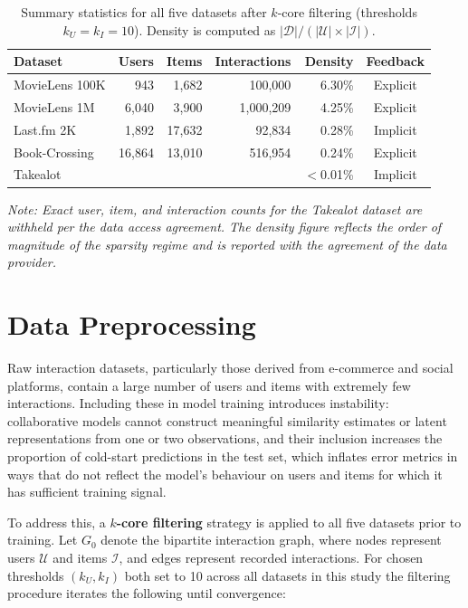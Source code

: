 \documentclass[11pt,a4paper]{report}
\begin{document}
\begin{table}[htbp]
\centering
\caption{Summary statistics for all five datasets after $k$-core filtering (thresholds $k_U = k_I = 10$). Density is computed as $|\mathcal{D}| / (|\mathcal{U}| \times |\mathcal{I}|)$.}
\label{tab:datasets}
\begin{tabular}{lrrrrc}
\hline
\textbf{Dataset} & \textbf{Users} & \textbf{Items} & \textbf{Interactions} & \textbf{Density} & \textbf{Feedback} \\
\hline
MovieLens 100K  & 943   & 1{,}682  & 100{,}000   & 6.30\%  & Explicit \\
MovieLens 1M    & 6{,}040 & 3{,}900 & 1{,}000{,}209 & 4.25\% & Explicit \\
Last.fm 2K      & 1{,}892 & 17{,}632 & 92{,}834   & 0.28\%  & Implicit \\
Book-Crossing   & 16{,}864 & 13{,}010 & 516{,}954 & 0.24\%  & Explicit \\
Takealot        &     &        &           & $<$0.01\% & Implicit \\
\hline
\end{tabular}
\end{table}

\noindent\textit{Note: Exact user, item, and interaction counts for the Takealot dataset are withheld per the data access agreement. The density figure reflects the order of magnitude of the sparsity regime and is reported with the agreement of the data provider.}

\section{Data Preprocessing}
\label{sec:method_preprocessing}

Raw interaction datasets, particularly those derived from e-commerce and social platforms, contain a large number of users and items with extremely few interactions. Including these in model training introduces instability: collaborative models cannot construct meaningful similarity estimates or latent representations from one or two observations, and their inclusion increases the proportion of cold-start predictions in the test set, which inflates error metrics in ways that do not reflect the model's behaviour on users and items for which it has sufficient training signal.

To address this, a \textbf{$k$-core filtering} strategy is applied to all five datasets prior to training. Let $G_0$ denote the bipartite interaction graph, where nodes represent users $\mathcal{U}$ and items $\mathcal{I}$, and edges represent recorded interactions. For chosen thresholds $(k_U, k_I)$ both set to 10 across all datasets in this study the filtering procedure iterates the following until convergence:
\end{document}
